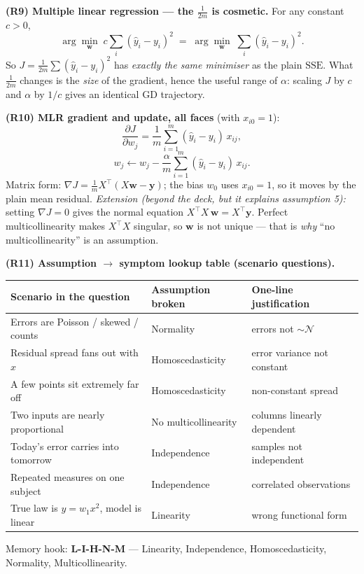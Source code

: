 \begin{derivedbox}
\medskip
\textbf{(R9) Multiple linear regression --- the $\tfrac{1}{2m}$ is cosmetic.}
For any constant $c>0$,
\[
  \arg\min_{\mathbf w}\; c\sum_i(\hat y_i-y_i)^2
  \;=\;\arg\min_{\mathbf w}\; \sum_i(\hat y_i-y_i)^2 .
\]
So $J=\frac{1}{2m}\sum(\hat y_i-y_i)^2$ has \emph{exactly the same minimiser} as the plain
$\mathrm{SSE}$. What $\tfrac{1}{2m}$ changes is the \emph{size} of the gradient, hence the
useful range of $\alpha$: scaling $J$ by $c$ and $\alpha$ by $1/c$ gives an identical GD
trajectory.

\medskip
\textbf{(R10) MLR gradient and update, all faces} (with $x_{i0}=1$):
\[
  \frac{\partial J}{\partial w_j}=\frac1m\sum_{i=1}^m(\hat y_i-y_i)\,x_{ij},
\]
\[
  w_j \leftarrow w_j-\frac{\alpha}{m}\sum_{i=1}^m(\hat y_i-y_i)\,x_{ij}.
\]
Matrix form: $\nabla J=\frac1m X^{\!\top}(X\mathbf w-\mathbf y)$; the bias $w_0$ uses
$x_{i0}=1$, so it moves by the plain mean residual.
\emph{Extension (beyond the deck, but it explains assumption 5):} setting $\nabla J=0$
gives the normal equation $X^{\!\top}\!X\,\mathbf w=X^{\!\top}\mathbf y$. Perfect
multicollinearity makes $X^{\!\top}\!X$ singular, so $\mathbf w$ is not unique --- that
is \emph{why} ``no multicollinearity'' is an assumption.

\medskip
\textbf{(R11) Assumption $\to$ symptom lookup table (scenario questions).}
\begin{center}\small
\begin{tabular}{@{}lll@{}}
\toprule
Scenario in the question & Assumption broken & One-line justification \\
\midrule
Errors are Poisson / skewed / counts & Normality & errors not $\sim\mathcal N$ \\
Residual spread fans out with $x$ & Homoscedasticity & error variance not constant \\
A few points sit extremely far off & Homoscedasticity & non-constant spread \\
Two inputs are nearly proportional & No multicollinearity & columns linearly dependent \\
Today's error carries into tomorrow & Independence & samples not independent \\
Repeated measures on one subject & Independence & correlated observations \\
True law is $y=w_1x^2$, model is linear & Linearity & wrong functional form \\
\bottomrule
\end{tabular}
\end{center}
Memory hook: \textbf{L-I-H-N-M} --- Linearity, Independence, Homoscedasticity,
Normality, Multicollinearity.
\end{derivedbox}

